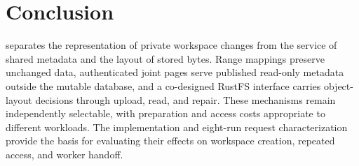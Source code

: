 \section{Conclusion}

\sys separates the representation of private workspace changes from
the service of shared metadata and the layout of stored bytes.
Range mappings preserve unchanged data, authenticated joint pages
serve published read-only metadata outside the mutable database, and
a co-designed RustFS interface carries object-layout decisions through
upload, read, and repair. These mechanisms remain independently
selectable, with preparation and access costs appropriate to different
workloads. The implementation and eight-run request characterization
provide the basis for evaluating their effects on workspace creation,
repeated access, and worker handoff.
